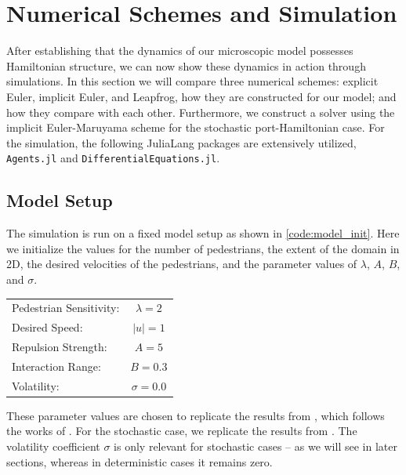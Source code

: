 \section{Numerical Schemes and Simulation}
After establishing that the dynamics of our microscopic model possesses Hamiltonian structure, we can now show these dynamics in action through simulations. In this section we will compare three numerical schemes: explicit Euler, implicit Euler, and Leapfrog, how they are constructed for our model; and how they compare with each other. Furthermore, we construct a solver using the implicit Euler-Maruyama scheme for the stochastic port-Hamiltonian case. For the simulation, the following JuliaLang packages are extensively utilized, \texttt{Agents.jl} and \texttt{DifferentialEquations.jl}.

\subsection{Model Setup}
The simulation is run on a fixed model setup as shown in \autoref{code:model_init}. Here we initialize the values for the number of pedestrians, the extent of the domain in 2D, the desired velocities of the pedestrians, and the parameter values of $\lambda$, $A$, $B$, and $\sigma$.
\begin{table}[H]
    \begin{tabular}{lc}
        Pedestrian Sensitivity: & $\lambda = 2$ \\
        Desired Speed: & $|u| = 1$ \\
        Repulsion Strength: & $A = 5$ \\
        Interaction Range: & $B = 0.3$ \\
        Volatility: & $\sigma = 0.0$
    \end{tabular}
\end{table}
These parameter values are chosen to replicate the results from \cite{tordeux2022multi}, which follows the works of \cite{helbing1995social,tordeux2016collision}. For the stochastic case, we replicate the results from \cite{khelfa2021initiating}. The volatility coefficient $\sigma$ is only relevant for stochastic cases -- as we will see in later sections, whereas in deterministic cases it remains zero.


